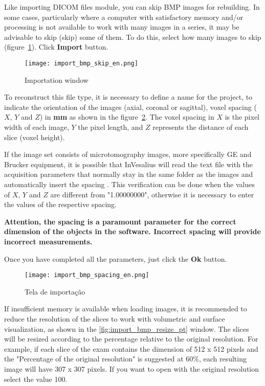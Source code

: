 Like importing DICOM files module, you can skip BMP images for rebuilding. In some cases, particularly where a computer with satisfactory memory and/or processing is not available to work with many images in a series, it may be advisable to skip (skip) some of them. To do this, select how many images to skip (figure~\ref{fig:import_bmp_skip_pt}). Click \textbf{Import} button.

\begin{figure}[!htb]
\centering
\texttt{[image: import\_bmp\_skip\_en.png]}
\caption{Importation window}
\label{fig:import_bmp_skip_pt}
\end{figure}

To reconstruct this file type, it is necessary to define a name for the project, to indicate the orientation of the images (axial, coronal or sagittal), voxel spacing ($X$, $Y$ and $Z$) in \textbf{mm} as shown in the figure~\ref{fig:import_bmp_spacing_pt}. The voxel spacing in $X$ is the pixel width of each image, $Y$ the pixel length, and $Z$ represents the distance of each slice (voxel height).

If the image set consists of microtomography images, more specifically GE and Brucker equipment, it is possible that InVesalius will read the text file with the acquisition parameters that normally stay in the same folder as the images and automatically insert the spacing . This verification can be done when the values of $X$, $Y$ and $Z$ are different from "1.00000000", otherwise it is necessary to enter the values of the respective spacing.

\textbf{Attention, the spacing is a paramount parameter for the correct dimension of the objects in the software. Incorrect spacing will provide incorrect measurements.}

Once you have completed all the parameters, just click the \textbf{Ok} button.

\begin{figure}[!htb]
\centering
\texttt{[image: import\_bmp\_spacing\_en.png]}
\caption{Tela de importação}
\label{fig:import_bmp_spacing_pt}
\end{figure}

If insufficient memory is available when loading images, it is recommended to reduce the resolution of the slices to work with volumetric and surface visualization, as shown in the \ref{fig:import_bmp_resize_pt} window. The slices will be resized according to the percentage relative to the original resolution. For example, if each slice of the exam contains the dimension of 512 x 512 pixels and the "Percentage of the original resolution" is suggested at 60\%, each resulting image will have 307 x 307 pixels. If you want to open with the original resolution select the value 100.

